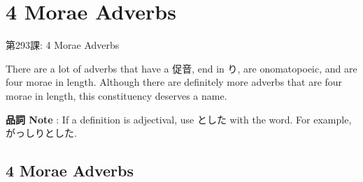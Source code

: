     
\chapter{4 Morae Adverbs}

\begin{center}
\begin{Large}
第293課: 4 Morae Adverbs 
\end{Large}
\end{center}
 
\par{ There are a lot of adverbs that have a 促音, end in り, are onomatopoeic, and are four morae in length. Although there are definitely more adverbs that are four morae in length, this constituency deserves a name. }

\par{\textbf{品詞 Note }: If a definition is adjectival, use とした with the word. For example, がっしりとした. }
      
\section{4 Morae Adverbs}
 
